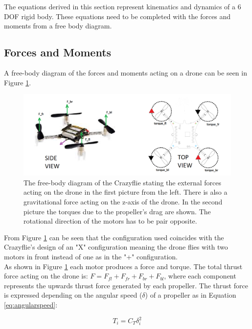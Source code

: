 The equations derived in this section represent kinematics and dynamics of a 6 DOF rigid body. These equations need to be completed with the forces and moments from a free body diagram.

\subsection{Forces and Moments}

A free-body diagram of the forces and moments acting on a drone can be seen in Figure \ref{figure:freebodydiagram}.

\begin{figure}[H]
\centering
 \includegraphics[scale=0.45]{Figures/f_m.png}
 \caption{The free-body diagram of the Crazyflie stating the external forces acting on the drone in the first picture from the left. There is also a gravitational force acting on the z-axis of the drone. In the second picture the torques due to the propeller's drag are shown. The rotational direction of the motors has to be pair opposite.}
 \label{figure:freebodydiagram}
\end{figure}

From Figure \ref{figure:freebodydiagram} can be seen that the configuration used coincides with the Crazyflie's design of an "X" configuration meaning the drone flies with two motors in front instead of one as in the "+" configuration.\\

As shown in Figure \ref{figure:freebodydiagram} each motor produces a force and torque. The total thrust force acting on the drone is: $F = F_{fl} + F_{fr} + F_{br} + F_{bl}$, where each component represents the upwards thrust force generated by each propeller. The thrust force is expressed depending on the angular speed ($\delta$) of a propeller as in Equation \ref{eq:angularspeed}:

\begin{equation}  \label{eq:angularspeed}
	T_i = C_T\delta_i^2
\end{equation}

